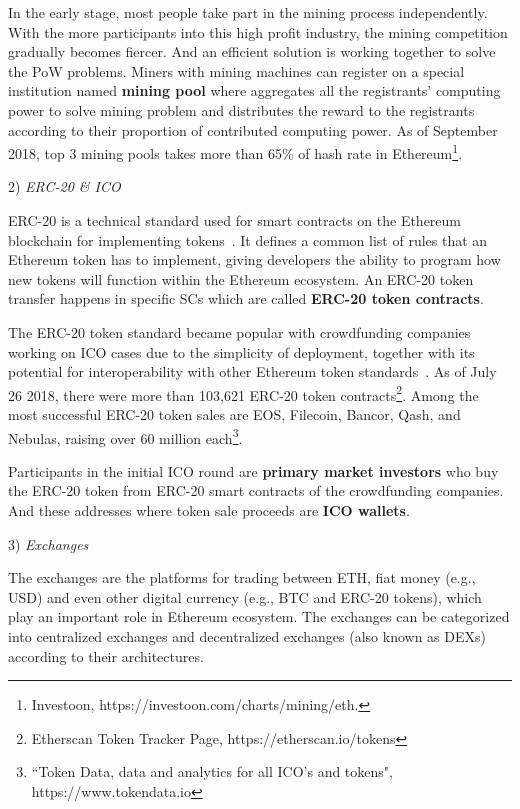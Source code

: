 In the early stage, most people take part in the mining process independently. With the more participants into this high profit industry, the mining competition gradually becomes fiercer. And an efficient solution is working together to solve the PoW problems. Miners with mining machines can register on a special institution named \textbf{mining pool} where aggregates all the registrants' computing power to solve mining problem and distributes the reward to the registrants according to their proportion of contributed computing power. As of September 2018, top $3$ mining pools takes more than 65\% of hash rate in Ethereum\footnote{Investoon, https://investoon.com/charts/mining/eth.}.



2) \emph{ERC-20 \& ICO}

ERC-20 is a technical standard used for smart contracts on the Ethereum blockchain for implementing tokens~\cite{erc-20-wiki}. It defines a common list of rules that an Ethereum token has to implement, giving developers the ability to program how new tokens will function within the Ethereum ecosystem. An ERC-20 token transfer happens in specific SCs which are called \textbf{ERC-20 token contracts}. %

The ERC-20 token standard became popular with crowdfunding companies working on ICO cases due to the simplicity of deployment, together with its potential for interoperability with other Ethereum token standards~\cite{erc-20}. As of July 26 2018, there were more than 103,621 ERC-20 token contracts\footnote{Etherscan Token Tracker Page, https://etherscan.io/tokens}. Among the most successful ERC-20 token sales are EOS, Filecoin, Bancor, Qash, and Nebulas, raising over 60 million each\footnote{``Token Data, data and analytics for all ICO's and tokens", https://www.tokendata.io}.

Participants in the initial ICO round are \textbf{primary market investors} who buy the ERC-20 token from ERC-20 smart contracts of the crowdfunding companies. And these addresses where token sale proceeds are \textbf{ICO wallets}.

3) \emph{Exchanges}

The exchanges are the platforms for trading between ETH, fiat money (e.g., USD) and even other digital currency (e.g., BTC and ERC-20 tokens), which play an important role in Ethereum ecosystem. The exchanges can be categorized into centralized exchanges and decentralized exchanges (also known as DEXs) according to their architectures.

